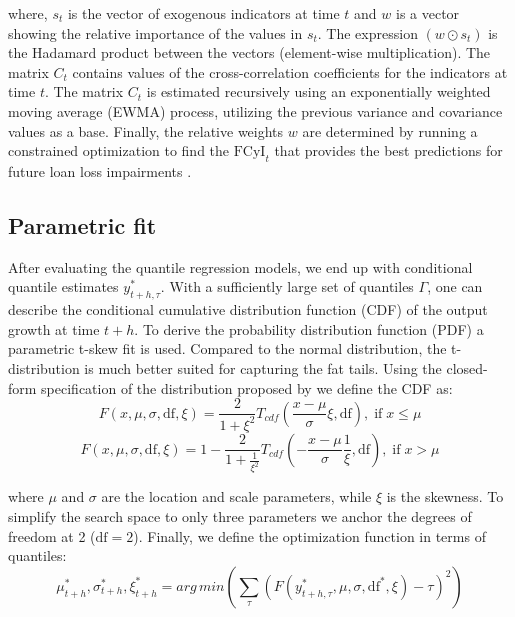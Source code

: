 where, $s_t$ is the vector of exogenous indicators at time $t$ and $w$ is a vector showing the relative importance of the values in $s_t$. The expression $(w\odot s_t)$ is the Hadamard product between the vectors (element-wise multiplication). The matrix $C_t$ contains values of the cross-correlation coefficients for the indicators at time $t$. The matrix $C_t$ is estimated recursively using an exponentially weighted moving average (EWMA) process, utilizing the previous variance and covariance values as a base. Finally, the relative weights $w$ are determined by running a constrained optimization to find the $\text{FCyI}_t$ that provides the best predictions for future loan loss impairments \citep{plasil2014}.

\subsection{Parametric fit}
After evaluating the quantile regression models, we end up with conditional quantile estimates $y_{t+h, \tau}^*$. With a sufficiently large set of quantiles $\Gamma$, one can describe the conditional cumulative distribution function (CDF) of the output growth at time $t+h$. To derive the probability distribution function (PDF) a parametric t-skew fit \citep{adrian_2019} is used. Compared to the normal distribution, the t-distribution is much better suited for capturing the fat tails. Using the closed-form specification of the distribution proposed by \citet{giot2003} we define the CDF as:
\begin{equation}
    \label{eq:tskew_cdf_n}
    F(x, \mu, \sigma, \text{df}, \xi) = \frac{2}{1+\xi^2} T_{cdf}\left(\frac{x-\mu}{\sigma}\xi, \text{df}\right), \;\text{if}\; x \leq \mu 
\end{equation}
\begin{equation}
    \label{eq:tskew_cdf_p}
    F(x, \mu, \sigma, \text{df}, \xi) = 1 - \frac{2}{1+\frac{1}{\xi^2}} T_{cdf}\left(-\frac{x-\mu}{\sigma}\frac{1}{\xi}, \text{df}\right), \;\text{if}\; x > \mu 
\end{equation}

where $\mu$ and $\sigma$ are the location and scale parameters, while $\xi$ is the skewness. To simplify the search space to only three parameters we anchor the degrees of freedom at 2 ($\text{df}=2$). Finally, we define the optimization function in terms of quantiles:
\begin{equation}
    \label{eq:tskew_cdf_loss}
    \mu_{t+h}^*, \sigma_{t+h}^*, \xi_{t+h}^* = arg\,min\left(\sum_\tau \left(F(y_{t+h, \tau}^*, \mu, \sigma, \text{df}^*, \xi)-\tau\right)^2\right)
\end{equation}

